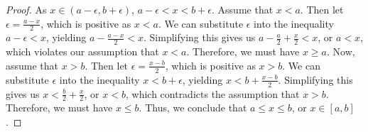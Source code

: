 \documentclass[12pt]{article}
\begin{document}
  \begin{proof}
    As $x \in (a - \epsilon, b + \epsilon)$, $a - \epsilon < x < b + \epsilon$. Assume that $x < a$. Then let $\epsilon = \frac{a - x}{2}$, which is positive as $x < a$. We can substitute $\epsilon$ into the inequality $a - \epsilon < x$, yielding $a - \frac{a - x}{2} < x$. Simplifying this gives us $a - \frac{a}{2} + \frac{x}{2} < x$, or $a < x$, which violates our assumption that $x < a$. Therefore, we must have $x \geq a$. 
    Now, assume that $x > b$. Then let $\epsilon = \frac{x - b}{2}$, which is positive as $x > b$. We can substitute $\epsilon$ into the inequality $x < b + \epsilon$, yielding $x < b + \frac{x - b}{2}$. Simplifying this gives us $x < \frac{b}{2} + \frac{x}{2}$, or $x < b$, which contradicts the assumption that $x > b$. Therefore, we must have $x \leq b$. Thus, we conclude that $a \leq x \leq b$, or $x \in [a, b]$.
  \end{proof}

  \newpage
\end{document}
